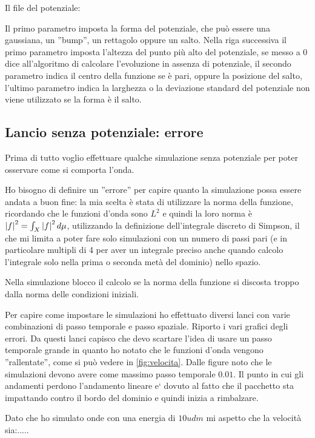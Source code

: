 Il file del potenziale:

Il primo parametro imposta la forma del potenziale, che pu\`o essere una gaussiana, un ''bump'', un rettagolo oppure un salto.
Nella riga successiva il primo parametro imposta l'altezza  del punto pi\`u alto del potenziale, se messo a 0 dice all'algoritmo di calcolare l'evoluzione in assenza di potenziale, il secondo parametro indica il centro della funzione se \`e pari, oppure la posizione del salto, l'ultimo parametro indica la larghezza o la deviazione standard del potenziale non viene utilizzato se la forma \`e il salto.
\subsection{Lancio senza potenziale: errore}\label{sec:errore}
Prima di tutto voglio effettuare qualche simulazione senza potenziale per poter osservare come si comporta l'onda.

Ho bisogno di definire un ''errore'' per capire quanto la simulazione possa essere andata a buon fine:
la mia scelta \`e stata di utilizzare la norma della funzione, ricordando che le funzioni d'onda sono $L^2$ e quindi la loro norma \`e  $\lr||f^2=\int_X\lr||f^2d\mu$, utilizzando la definizione dell'integrale discreto di Simpson, il che mi limita a poter fare solo simulazioni con un numero di passi pari (e in particolare multipli di 4 per aver un integrale preciso anche quando calcolo l'integrale solo nella prima o seconda met\`a del dominio) nello spazio.

Nella simulazione blocco il calcolo se la norma della funzione si discosta troppo dalla norma delle condizioni iniziali.

Per capire come impostare le simulazioni ho effettuato diversi lanci con varie combinazioni di passo temporale e passo spaziale. Riporto i vari grafici degli errori.
Da questi lanci capisco che devo scartare l'idea di usare un passo temporale grande in quanto ho notato che le funzioni d'onda vengono ''rallentate'', come si pu\`o vedere in \autoref{fig:velocita}. Dalle figure noto che le simulazioni devono avere come massimo passo temporale $0.01$. Il punto in cui gli andamenti perdono l'andamento lineare e` dovuto al fatto che il pacchetto sta impattando contro il bordo del dominio e quindi inizia a rimbalzare.

Dato che ho simulato onde con una energia di $10 udm$ mi aspetto che la velocit\`a sia:.....%

